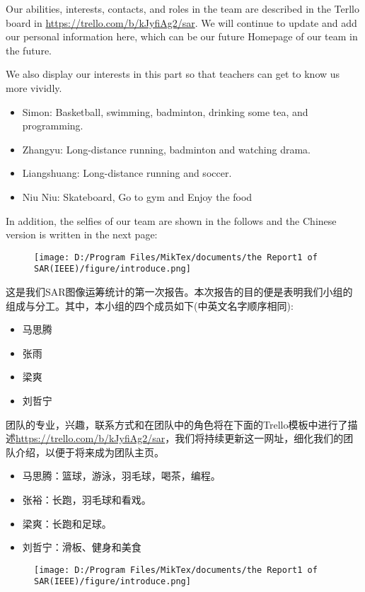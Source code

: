 \documentclass[12pt, journal, onecolumn]{IEEEtran}
\begin{document}
\begin{CJK*}{UTF8}{gbsn}
Our abilities, interests, contacts, and roles in the team are described in the Terllo board in \url{https://trello.com/b/kJyfiAg2/sar}. We will continue to update and add our personal information here, which can be our future Homepage of our team in the future.

We also display our interests in this part so that teachers can get to know us more vividly.
\begin{itemize}
\item {Simon: Basketball, swimming, badminton, drinking some tea, and programming.}
\item {Zhangyu: Long-distance running, badminton and watching drama.}
\item {Liangshuang: Long-distance running and soccer.}
\item {Niu Niu: Skateboard, Go to gym and Enjoy the food}
\end{itemize}

In addition, the selfies of our team are shown in the follows and the Chinese version is written in the next page:
\begin{figure}[h]
\begin{center}
\texttt{[image: D:/Program Files/MikTex/documents/the Report1 of SAR(IEEE)/figure/introduce.png]}
\end{center}
\end{figure}

\newpage
这是我们SAR图像运筹统计的第一次报告。本次报告的目的便是表明我们小组的组成与分工。其中，本小组的四个成员如下(中英文名字顺序相同):
\begin{itemize}
\item 马思腾
\item 张雨
\item 梁爽
\item 刘哲宁
\end{itemize}

团队的专业，兴趣，联系方式和在团队中的角色将在下面的Trello模板中进行了描述\url{https://trello.com/b/kJyfiAg2/sar}，我们将持续更新这一网址，细化我们的团队介绍，以便于将来成为团队主页。
\begin{itemize}
\item 马思腾：篮球，游泳，羽毛球，喝茶，编程。
\item 张裕：长跑，羽毛球和看戏。
\item 梁爽：长跑和足球。
\item 刘哲宁：滑板、健身和美食
\end{itemize}
    
\begin{figure}[h]
\begin{center}
\texttt{[image: D:/Program Files/MikTex/documents/the Report1 of SAR(IEEE)/figure/introduce.png]}
\end{center}
\end{figure}
\end{CJK*} 
\end{document}
